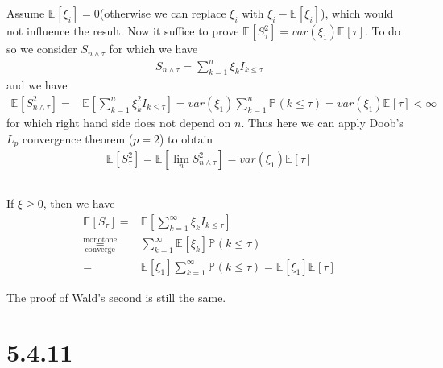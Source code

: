 \documentclass[11pt,a4paper]{ctexart}
\numberwithin{equation}{section}%
\begin{document}
\subsection{}

Assume $ \mathbb{E}_{  }\left[ \xi _i \right] = 0  $(otherwise we can replace $ \xi _i $ with $ \xi _i-\mathbb{E}_{  }\left[ \xi _i \right]  $), which would not influence the result. Now it suffice to prove $ \mathbb{E}_{  }\left[ S_\tau^2 \right] =var(\xi _1)\mathbb{E}_{  }\left[ \tau \right]  $. To do so we consider $ S_{n\wedge \tau} $ for which we have
\begin{align*}
    S_{n\wedge \tau}=\sum_{k=1}^n \xi _k I_{k\leq \tau} 
\end{align*}
and we have
\begin{align*}
    \mathbb{E}_{  }\left[ S_{n\wedge \tau}^2 \right] =& \mathbb{E}_{  }\left[ \sum_{k=1}^n \xi _k^2 I_{k\leq \tau} \right] = var(\xi _1)\sum_{k=1}^n \mathbb{P}_{  }\left( k\leq \tau \right) = var(\xi _1)\mathbb{E}_{  }\left[ \tau \right] <\infty
\end{align*}
for which right hand side does not depend on $ n $. Thus here we can apply Doob's $ L_p $ convergence theorem ($ p=2 $) to obtain 
\begin{align*}
    \mathbb{E}_{  }\left[ S_\tau^2 \right] = \mathbb{E}_{  }\left[ \lim_n S_{n\wedge \tau}^2 \right] = var(\xi _1)\mathbb{E}_{  }\left[ \tau \right]  
\end{align*}


\subsection{}

If $ \xi \geq 0 $, then we have
    \begin{align*}
        \mathbb{E}_{  }\left[ S_\tau \right]=& \mathbb{E}_{  }\left[ \sum_{k=1}^\infty \xi _k I_{k\leq \tau} \right] \\
        \mathop{ = }\limits^{\text{monotone}}_{\text{converge}} & \sum_{k=1}^\infty \mathbb{E}_{  }\left[ \xi _k \right] \mathbb{P}_{  }\left( k\leq \tau \right) \\
        =&\mathbb{E}_{  }\left[\xi _1 \right]\sum_{k=1}^\infty \mathbb{P}_{  }\left( k\leq \tau \right) = \mathbb{E}_{  }\left[ \xi _1  \right] \mathbb{E}_{  }\left[ \tau \right] 
    \end{align*}

The proof of Wald's second is still the same.

\section{5.4.11}
\end{document}
